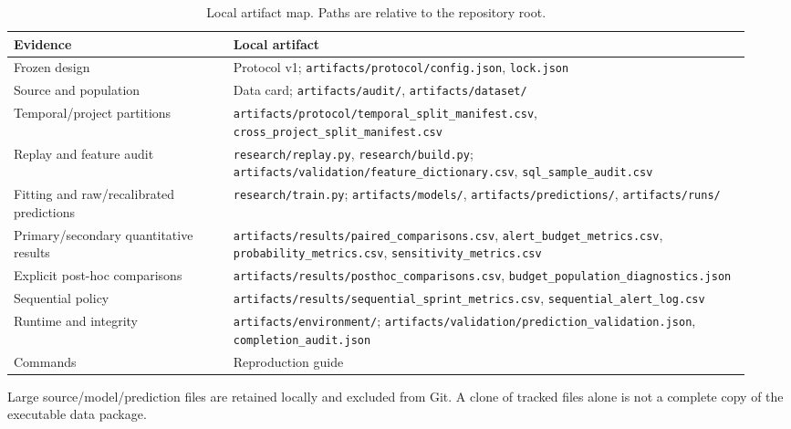 \documentclass[11pt,a4paper]{article}
\begin{document}
{\def\LTcaptype{table}
\begin{longtable}{@{}>{\raggedright\arraybackslash}p{0.28\linewidth}>{\raggedright\arraybackslash}p{0.66\linewidth}@{}}
\caption{Local artifact map. Paths are relative to the repository root.}\label{tab:artifact_map}\\
\toprule
Evidence & Local artifact \\
\midrule
Frozen design & Protocol v1; \texttt{artifacts/\allowbreak{}protocol/\allowbreak{}config.json}, \texttt{lock.json} \\
Source and population & Data card; \texttt{artifacts/\allowbreak{}audit/\allowbreak{}}, \texttt{artifacts/\allowbreak{}dataset/\allowbreak{}} \\
Temporal/project partitions & \texttt{artifacts/\allowbreak{}protocol/\allowbreak{}temporal\_\allowbreak{}split\_\allowbreak{}manifest.csv}, \texttt{cross\_\allowbreak{}project\_\allowbreak{}split\_\allowbreak{}manifest.csv} \\
Replay and feature audit & \texttt{research/\allowbreak{}replay.py}, \texttt{research/\allowbreak{}build.py}; \texttt{artifacts/\allowbreak{}validation/\allowbreak{}feature\_\allowbreak{}dictionary.csv}, \texttt{sql\_\allowbreak{}sample\_\allowbreak{}audit.csv} \\
Fitting and raw/recalibrated predictions & \texttt{research/\allowbreak{}train.py}; \texttt{artifacts/\allowbreak{}models/\allowbreak{}}, \texttt{artifacts/\allowbreak{}predictions/\allowbreak{}}, \texttt{artifacts/\allowbreak{}runs/\allowbreak{}} \\
Primary/secondary quantitative results & \texttt{artifacts/\allowbreak{}results/\allowbreak{}paired\_\allowbreak{}comparisons.csv}, \texttt{alert\_\allowbreak{}budget\_\allowbreak{}metrics.csv}, \texttt{probability\_\allowbreak{}metrics.csv}, \texttt{sensitivity\_\allowbreak{}metrics.csv} \\
Explicit post-hoc comparisons & \texttt{artifacts/\allowbreak{}results/\allowbreak{}posthoc\_\allowbreak{}comparisons.csv}, \texttt{budget\_\allowbreak{}population\_\allowbreak{}diagnostics.json} \\
Sequential policy & \texttt{artifacts/\allowbreak{}results/\allowbreak{}sequential\_\allowbreak{}sprint\_\allowbreak{}metrics.csv}, \texttt{sequential\_\allowbreak{}alert\_\allowbreak{}log.csv} \\
Runtime and integrity & \texttt{artifacts/\allowbreak{}environment/\allowbreak{}}; \texttt{artifacts/\allowbreak{}validation/\allowbreak{}prediction\_\allowbreak{}validation.json}, \texttt{completion\_\allowbreak{}audit.json} \\
Commands & Reproduction guide \\
\bottomrule
\end{longtable}

}

Large source/model/prediction files are retained locally and excluded from Git. A clone of tracked files alone is not a complete copy of the executable data package.
\end{document}
